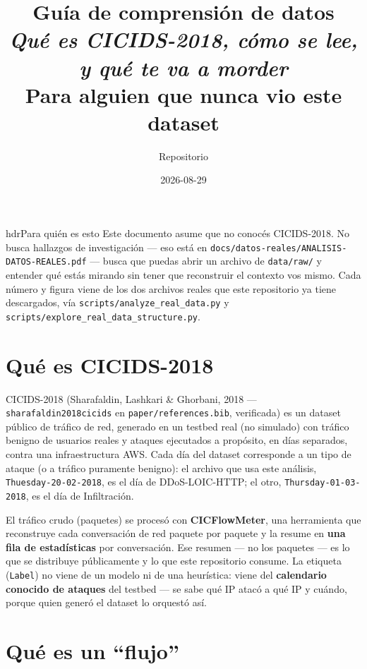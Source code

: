 \documentclass[11pt]{article}
\title{\textbf{\Large Guía de comprensión de datos}\\[4pt]
\Large \textit{Qué es CICIDS-2018, cómo se lee, y qué te va a morder}\\[8pt]
\normalsize Para alguien que nunca vio este dataset}
\author{Repositorio \code{Ironsss/iag-symmetry}}
\date{2026-08-29}
\newcommand{\code}[1]{\texttt{\small #1}}
\begin{document}
\maketitle
\thispagestyle{empty}

\begin{cbox}{hdr}{Para quién es esto}
Este documento asume que no conocés CICIDS-2018. No busca hallazgos de investigación
--- eso está en \code{docs/datos-reales/ANALISIS-DATOS-REALES.pdf} --- busca que puedas
abrir un archivo de \code{data/raw/} y entender qué estás mirando sin tener que reconstruir
el contexto vos mismo. Cada número y figura viene de los dos archivos reales que este
repositorio ya tiene descargados, vía \code{scripts/analyze\_real\_data.py} y
\code{scripts/explore\_real\_data\_structure.py}.
\end{cbox}

\tableofcontents
\newpage

\section{Qué es CICIDS-2018}

CICIDS-2018 (Sharafaldin, Lashkari \& Ghorbani, 2018 --- \code{sharafaldin2018cicids} en
\code{paper/references.bib}, verificada) es un dataset público de tráfico de red, generado
en un testbed real (no simulado) con tráfico benigno de usuarios reales y ataques
ejecutados a propósito, en días separados, contra una infraestructura AWS. Cada día del
dataset corresponde a un tipo de ataque (o a tráfico puramente benigno): el archivo que
usa este análisis, \code{Thuesday-20-02-2018}, es el día de DDoS-LOIC-HTTP; el otro,
\code{Thursday-01-03-2018}, es el día de Infiltración.

El tráfico crudo (paquetes) se procesó con \textbf{CICFlowMeter}, una herramienta que
reconstruye cada conversación de red paquete por paquete y la resume en \textbf{una fila
de estadísticas} por conversación. Ese resumen --- no los paquetes --- es lo que se
distribuye públicamente y lo que este repositorio consume. La etiqueta (\code{Label}) no
viene de un modelo ni de una heurística: viene del \textbf{calendario conocido de
ataques} del testbed --- se sabe qué IP atacó a qué IP y cuándo, porque quien generó el
dataset lo orquestó así.

\section{Qué es un ``flujo''}
\end{document}
